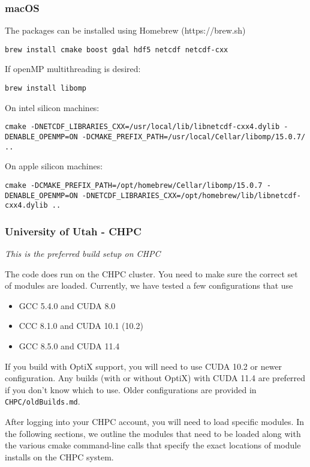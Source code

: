 \subsubsection{macOS}

The packages can be installed using Homebrew (https://brew.sh)

\begin{verbatim}
brew install cmake boost gdal hdf5 netcdf netcdf-cxx
\end{verbatim}

If openMP multithreading is desired: 
\begin{verbatim}
brew install libomp
\end{verbatim}

On intel silicon machines:
\begin{verbatim}
cmake -DNETCDF_LIBRARIES_CXX=/usr/local/lib/libnetcdf-cxx4.dylib -DENABLE_OPENMP=ON -DCMAKE_PREFIX_PATH=/usr/local/Cellar/libomp/15.0.7/ ..
\end{verbatim}

On apple silicon machines:
\begin{verbatim}
cmake -DCMAKE_PREFIX_PATH=/opt/homebrew/Cellar/libomp/15.0.7 -DENABLE_OPENMP=ON -DNETCDF_LIBRARIES_CXX=/opt/homebrew/lib/libnetcdf-cxx4.dylib ..
\end{verbatim}

\subsubsection{University of Utah - CHPC}

\textit{This is the preferred build setup on CHPC}

The code does run on the CHPC cluster. You need to make sure the correct set of modules are loaded.  Currently, we have tested a few configurations that use
\begin{itemize}
\item GCC 5.4.0 and CUDA 8.0
\item CCC 8.1.0 and CUDA 10.1 (10.2)
\item GCC 8.5.0 and CUDA 11.4
\end{itemize}
If you build with OptiX support, you will need to use CUDA 10.2 or newer configuration. Any builds (with or without OptiX) with CUDA 11.4 are preferred if you don't know which to use. Older configurations are provided in \verb|CHPC/oldBuilds.md|.

After logging into your CHPC account, you will need to load specific modules. In the following sections, we outline the modules that need to be loaded along with the various cmake command-line calls that specify the exact locations of module installs on the CHPC system.  

